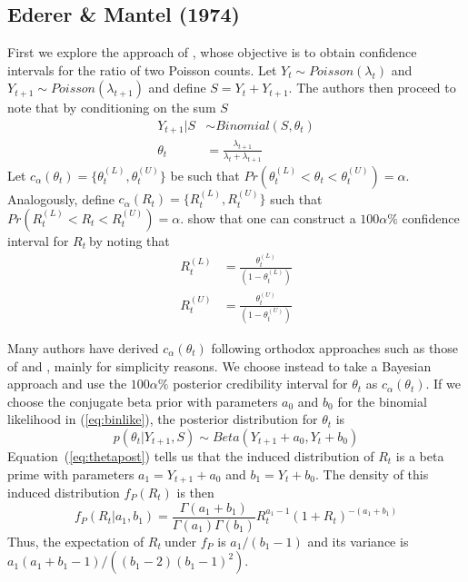 \documentclass[12pt]{article}
\def \rr {$R_{t}\ $}
\begin{document}
\subsection{Ederer \& Mantel (1974)}
\label{sec:mantel}

First we explore the approach of \citet{mantel}, whose objective is to obtain confidence intervals for the ratio of two Poisson counts. 
Let $Y_{t} \sim Poisson(\lambda_t)$ and $Y_{t+1} \sim Poisson(\lambda_{t+1})$ and define $S = Y_{t} + Y_{t+1}$.
The authors then proceed to note that by conditioning on the sum $S$
\begin{align}
\label{eq:binlike}
Y_{t+1} | S &\sim Binomial(S, \theta_t) \\
\theta_t &= \frac{\lambda_{t+1}}{\lambda_{t} + \lambda_{t+1}}
\end{align}
Let $c_{\alpha}(\theta_t) = \{\theta_t^{(L)} , \theta_t^{(U)} \}$ be such that $Pr(\theta_t^{(L)}<\theta_t <\theta_t^{(U)}) = \alpha$.
Analogously, define $c_{\alpha}(R_t) = \{R_t^{(L)} , R_t^{(U)} \}$ such that $Pr(R_t^{(L)}<R_t<R_t^{(U)}) = \alpha$.
\citet{mantel} show that one can construct a $100\alpha \%$ confidence interval for \rr by noting that
\begin{align}
 R_t^{(L)} &= \frac{\theta_t^{(L)}}{(1-\theta_t^{(L)})}\\
 R_t^{(U)} &= \frac{\theta_t^{(U)}}{(1-\theta_t^{(U)})}
\end{align}

Many authors have derived $c_{\alpha}(\theta_t)$ following orthodox approaches such as those of \citet{wilson} and \citet{clopper}, mainly for simplicity reasons.
We choose instead to take a Bayesian approach and use the  $100\alpha \%$ posterior credibility interval for $\theta_t$ as $c_{\alpha}(\theta_t)$.
If we choose the conjugate beta prior with parameters $a_0$ and $b_0$ for the binomial likelihood in (\ref{eq:binlike}), the posterior distribution for $\theta_t$ is
\begin{equation}
\label{eq:thetapost}
p(\theta_t| Y_{t+1}, S) \sim Beta(Y_{t+1} + a_0, Y_t + b_0)
\end{equation}
Equation~(\ref{eq:thetapost}) tells us that the induced distribution of $R_t$ is a beta prime with parameters $ a_1 = Y_{t+1} + a_0$ and $b_1 =  Y_t + b_0$.
The density of this induced distribution  $f_P(R_t)$ is then 
\begin{equation}
\label{eq:densityMantel}
f_P(R_t| a_1, b_1) = \frac{\Gamma(a_1 + b_1)}{\Gamma(a_1)\Gamma(b_1)} R_t^{a_1 - 1} (1 + R_t)^{-(a_1 + b_1)}
\end{equation}
Thus, the expectation of \rr under $f_P$ is $a_1/(b_1 - 1)$ and its variance is $a_1(a_1 + b_1 - 1)/\left((b_1 - 2)(b_1 - 1)^2 \right) $.
\end{document}
